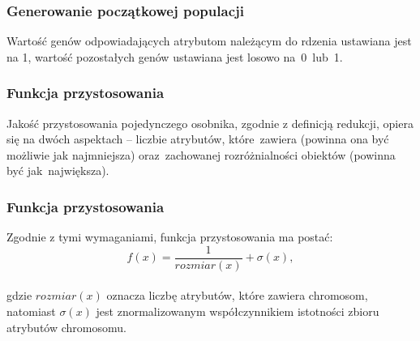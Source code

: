 \documentclass[10pt]{beamer}
\begin{document}
\begin{frame}
\frametitle{Generowanie początkowej populacji}
\begin{spacing}{1.5}
\begin{flushleft}
Wartość genów odpowiadających atrybutom należącym do rdzenia ustawiana jest na 1, wartość pozostałych genów ustawiana jest losowo 
na~0~lub~1.
\end{flushleft}
\end{spacing}

\end{frame}


\begin{frame}
\frametitle{Funkcja przystosowania}
\begin{spacing}{1.5}
\begin{flushleft}
Jakość przystosowania pojedynczego osobnika, zgodnie z definicją redukcji, opiera się na dwóch aspektach -- liczbie atrybutów, które~zawiera (powinna ona być możliwie jak najmniejsza) oraz~zachowanej rozróżnialności obiektów (powinna być jak~największa).
\end{flushleft}
\end{spacing}

\end{frame}


\begin{frame}
\frametitle{Funkcja przystosowania}
\begin{spacing}{1.5}
\begin{flushleft}
Zgodnie z tymi wymaganiami, funkcja przystosowania ma postać:\\
$$f(x) = {\frac{1}{rozmiar(x)}} + \sigma(x),$$\\
gdzie $rozmiar(x)$ oznacza liczbę atrybutów, które zawiera chromosom,  natomiast $\sigma(x)$ jest znormalizowanym współczynnikiem istotności zbioru atrybutów chromosomu.

\end{flushleft}
\end{spacing}

\end{frame}
\end{document}
